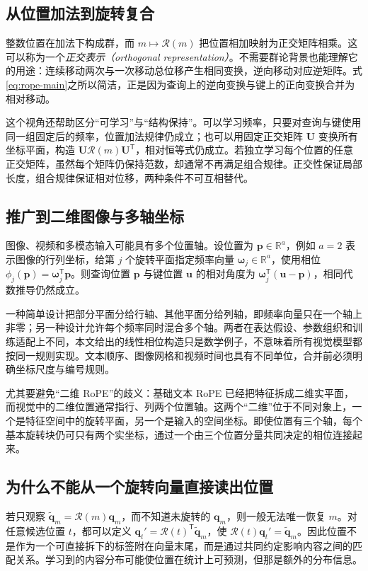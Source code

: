 \documentclass[UTF8,12pt,a4paper,fontset=fandol]{ctexart}
\begin{document}
\subsection{从位置加法到旋转复合}
整数位置在加法下构成群，而 $m\mapsto\mathcal R(m)$ 把位置相加映射为正交矩阵相乘。这可以称为一个\emph{正交表示（orthogonal representation）}。不需要群论背景也能理解它的用途：连续移动两次与一次移动总位移产生相同变换，逆向移动对应逆矩阵。式\eqref{eq:rope-main}之所以简洁，正是因为查询上的逆向变换与键上的正向变换合并为相对移动。

这个视角还帮助区分“可学习”与“结构保持”。可以学习频率，只要对查询与键使用同一组固定后的频率，位置加法规律仍成立；也可以用固定正交矩阵 $\mathbf U$ 变换所有坐标平面，构造 $\mathbf U\mathcal R(m)\mathbf U^{\mathsf T}$，相对恒等式仍成立。若独立学习每个位置的任意正交矩阵，虽然每个矩阵仍保持范数，却通常不再满足组合规律。正交性保证局部长度，组合规律保证相对位移，两种条件不可互相替代。

\subsection{推广到二维图像与多轴坐标}
图像、视频和多模态输入可能具有多个位置轴。设位置为 $\mathbf p\in\mathbb R^a$，例如 $a=2$ 表示图像的行列坐标，给第 $j$ 个旋转平面指定频率向量 $\boldsymbol\omega_j\in\mathbb R^a$，使用相位 $\phi_j(\mathbf p)=\boldsymbol\omega_j^{\mathsf T}\mathbf p$。则查询位置 $\mathbf p$ 与键位置 $\mathbf u$ 的相对角度为 $\boldsymbol\omega_j^{\mathsf T}(\mathbf u-\mathbf p)$，相同代数推导仍然成立。

一种简单设计把部分平面分给行轴、其他平面分给列轴，即频率向量只在一个轴上非零；另一种设计允许每个频率同时混合多个轴。两者在表达假设、参数组织和训练适配上不同，本文给出的线性相位构造只是数学例子，不意味着所有视觉模型都按同一规则实现。文本顺序、图像网格和视频时间也具有不同单位，合并前必须明确坐标尺度与编号规则。

尤其要避免“二维 RoPE”的歧义：基础文本 RoPE 已经把特征拆成二维实平面，而视觉中的二维位置通常指行、列两个位置轴。这两个“二维”位于不同对象上，一个是特征空间中的旋转平面，另一个是输入的空间坐标。即使位置有三个轴，每个基本旋转块仍可只有两个实坐标，通过一个由三个位置分量共同决定的相位连接起来。

\subsection{为什么不能从一个旋转向量直接读出位置}
若只观察 $\widetilde{\mathbf q}_m=\mathcal R(m)\mathbf q_m$，而不知道未旋转的 $\mathbf q_m$，则一般无法唯一恢复 $m$。对任意候选位置 $t$，都可以定义 $\mathbf q_t'=\mathcal R(t)^{\mathsf T}\widetilde{\mathbf q}_m$，使 $\mathcal R(t)\mathbf q_t'=\widetilde{\mathbf q}_m$。因此位置不是作为一个可直接拆下的标签附在向量末尾，而是通过共同约定影响内容之间的匹配关系。学习到的内容分布可能使位置在统计上可预测，但那是额外的分布信息。
\end{document}
